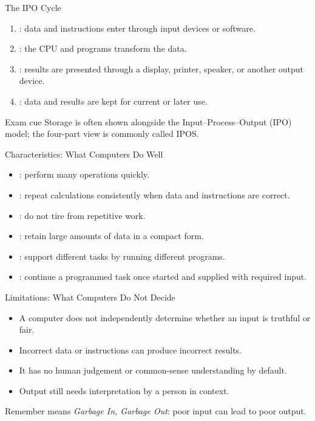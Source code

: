 \documentclass[aspectratio=169]{beamer}
\begin{document}
\begin{frame}{The IPO Cycle}
  \begin{enumerate}
    \item {}: data and instructions enter through input devices or
      software.
    \item {}: the CPU and programs transform the data.
    \item {}: results are presented through a display, printer,
      speaker, or another output device.
    \item {}: data and results are kept for current or later use.
  \end{enumerate}
  \begin{alertblock}{Exam cue}
    Storage is often shown alongside the Input--Process--Output (IPO) model;
    the four-part view is commonly called IPOS.
  \end{alertblock}
\end{frame}

\begin{frame}{Characteristics: What Computers Do Well}
  \begin{itemize}
    \item {}: perform many operations quickly.
    \item {}: repeat calculations consistently when data and
      instructions are correct.
    \item {}: do not tire from repetitive work.
    \item {}: retain large amounts of data in a compact form.
    \item {}: support different tasks by running different
      programs.
    \item {}: continue a programmed task once started and
      supplied with required input.
  \end{itemize}
\end{frame}

\begin{frame}{Limitations: What Computers Do Not Decide}
  \begin{itemize}
    \item A computer does not independently determine whether an input is
      truthful or fair.
    \item Incorrect data or instructions can produce incorrect results.
    \item It has no human judgement or common-sense understanding by default.
    \item Output still needs interpretation by a person in context.
  \end{itemize}
  \begin{block}{Remember}
     means \emph{Garbage In, Garbage Out}: poor input can lead to
    poor output.
  \end{block}
\end{frame}
\end{document}
